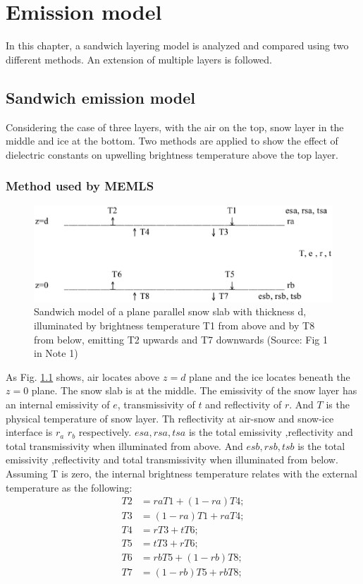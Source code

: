 \chapter{Emission model}
\label{cha:emission_model}

In this chapter, a sandwich layering model is analyzed and compared using two different methods. An extension of multiple layers is followed. 

\section{Sandwich emission model}
\label{sec:sandwich}
Considering the case of three layers, with the air on the top, snow layer in the middle and ice at the bottom. Two methods are applied to show the effect of dielectric constants on upwelling brightness temperature above the top layer.

\subsection{Method used by MEMLS}
\label{sandwich_memls}
\begin{figure}[!h]
  \centering
 \includegraphics[scale=0.5]{sandwich.eps} 
  \caption{Sandwich model of a plane parallel snow slab with thickness d, illuminated by brightness temperature T1 from above and by T8 from below, emitting T2 upwards and T7 downwards (Source: Fig 1 in Note 1)}
\label{fig:sandwich}
\end{figure}
As Fig. \ref{fig:sandwich} shows, air locates above $z=d$ plane and the ice locates beneath the $z=0$ plane. The snow slab is at the middle. The emissivity of  the snow layer has an internal emissivity of $e$, transmissivity of $t$ and reflectivity of $r$. And $T$ is the physical temperature of snow layer. Th reflectivity at air-snow and snow-ice interface is $r_a$ $r_b$ respectively. $esa,rsa,tsa$ is the total emissivity ,reflectivity and total transmissivity when illuminated from above. And $esb,rsb,tsb$ is the total emissivity ,reflectivity and total transmissivity when illuminated from below. 
Assuming T is zero, the internal brightness temperature relates with the external temperature as the following:
\begin{equation*}
  \label{eq:sandwich}
\begin{split}
T2&=raT1+(1-ra)T4;\\
T3&=(1-ra)T1+raT4;\\
T4&=rT3+tT6;\\
T5&=tT3+rT6;\\
T6&=rbT5+(1-rb)T8;\\
T7&=(1-rb)T5+rbT8;\\
\end{split}
\end{equation*}

